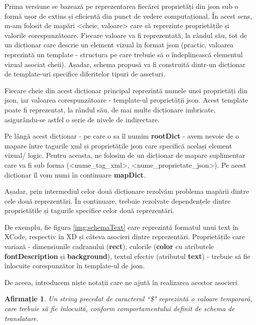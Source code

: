 Prima versiune se bazează pe reprezentarea fiecărei proprietăți din json sub o formă ușor de extins și eficientă din punct de vedere computațional. În acest sens, m-am folosit de mapări <cheie, valoare> care să reprezinte proprietățile și valorile corespunzătoare. Fiecare valoare va fi reprezentată, la rândul său, tot de un dicționar care descrie un element vizual în format json (practic, valoarea reprezintă un template - structura pe care trebuie să o îndeplinească elementul vizual asociat cheii). Așadar, schema propusă va fi construită dintr-un dicționar de template-uri specifice diferitelor tipuri de asseturi.

Fiecare cheie din acest dicționar principal reprezintă numele unei proprietăți din json, iar valoarea corespunzătoare - template-ul proprietății json.  Acest template poate fi reprezentat, la rândul său, de mai multe dicționare imbricate, asigurându-se astfel o serie de nivele de indirectare.

Pe lângă acest dicționar - pe care o sa îl numim \textbf{rootDict} - avem nevoie de o mapare între tagurile xml și proprietățile json care specifică același element vizual/ logic. Pentru aceasta, ne folosim de un dicționar de mapare suplimentar care va fi sub forma (<nume_tag_xml>,  <nume_proprietate_json>). Pe acest dicționar îl vom numi în continuare \textbf{mapDict}.

Așadar, prin intermediul celor două dicționare rezolvăm problema mapării dintre cele două reprezentări. 
În continuare, trebuie rezolvate dependențele dintre proprietățile și tagurile specifice celor două reprezentări.




De exemplu, fie figura \ref{img:schemaText} care reprezintă formatul unui text în XCode, respectiv în XD și câteva asocieri dintre reprezentări.
Proprietățile care variază - dimensiunile cadranului (\textbf{rect}), culorile (\textbf{color} cu atributele \textbf{fontDescription} și \textbf{background}), textul efectiv (atributul \textbf{text}) - trebuie să fie înlocuite corespunzător în template-ul de json.


De aceea, introducem niște notații care ne ajută în realizarea acestor asocieri. 
\\

\newtheorem{mydef}{Afirmație}[chapter]
\newtheorem{myNote}{Notă}[chapter]

\begin{mydef}\label{dollar}
Un string precedat de caracterul ``\$" reprezintă o valoare temporară, care trebuie să fie înlocuită, conform comportamentului definit de schema de translatare.\\
\end{mydef}


